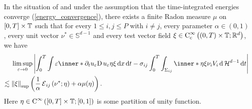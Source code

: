 \begin{proposition}
	\label{convergence_of_velocity_multiphase}
	In the situation of  and under 
	the assumption that the time-integrated energies converge 
	(\ref{energy_convergence}), there exists a finite Radon measure $ \mu $ on 
	$ [ 0 , T ] \times \operatorname{\mathbb{T}} $ such that for every $ 1 \leq i , j \leq P $ 
	with $ i \neq j $, every parameter $ \alpha \in ( 0 , 1 ) $, every unit 
	vector $ \nu^{ \ast } \in \mathbb{ S }^{ d - 1 } $ and every test vector 
	field $ \xi \in \operatorname{C}_{ \mathrm{c} }^{ \infty } \left( ( 0 , T ) \times 
	\operatorname{\mathbb{T}} ; \mathbb{ R }^{ d } \right) $, we have
	\begin{align*}
		& \limsup_{ \varepsilon \to 0 }
		\abs{
			\int_{ 0 }^{ T }
			\int
			\varepsilon
			\inner*{ \partial_{ t } u_{ \varepsilon } }{ \diff u_{ 
					\varepsilon } \eta \xi }
			\dd{ x }
			\dd{ t }
			-
			\sigma_{ i j }
			\int_{ 0 }^{ T }
			\int_{ \Sigma_{ i j } }
			\inner*{ \eta \xi }{ \nu_{ i } } V_{ i }
			\dd{ \hm^{ d - 1 } }
			\dd{ t }
		}
		\\
		\lesssim{} &
		\norm{ \xi }_{ \mathrm{sup} }
		\left(
		\frac{ 1 }{ \alpha } \tilt_excess_{ i j } \left( \nu^{ \ast } ; 
		\eta \right) 
		+ \alpha \mu ( \eta ) 
		\right).
	\end{align*}
	Here $ \eta \in \operatorname{C}^{ \infty } \left( [ 0 , T ] \times \operatorname{\mathbb{T}} ;  
	[ 0 , 1 ]
	\right) $ is some partition of unity function.
\end{proposition}


